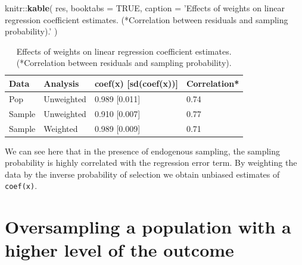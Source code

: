 \documentclass[]{book}
\newenvironment{Shaded}{\begin{snugshade}}{\end{snugshade}}
\newcommand{\KeywordTok}[1]{\textcolor[rgb]{0.13,0.29,0.53}{\textbf{{#1}}}}
\newcommand{\DataTypeTok}[1]{\textcolor[rgb]{0.13,0.29,0.53}{{#1}}}
\newcommand{\StringTok}[1]{\textcolor[rgb]{0.31,0.60,0.02}{{#1}}}
\newcommand{\OtherTok}[1]{\textcolor[rgb]{0.56,0.35,0.01}{{#1}}}
\newcommand{\NormalTok}[1]{{#1}}
\theoremstyle{definition}
\theoremstyle{definition}
\theoremstyle{remark}
\begin{document}
\begin{Shaded}
\begin{Highlighting}[]
\NormalTok{knitr::}\KeywordTok{kable}\NormalTok{(}
  \NormalTok{res, }\DataTypeTok{booktabs =} \OtherTok{TRUE}\NormalTok{,}
  \DataTypeTok{caption =} \StringTok{'Effects of weights on linear regression coefficient estimates. (*Correlation between residuals and sampling probability).'}
\NormalTok{)}
\end{Highlighting}
\end{Shaded}

\begin{table}

\caption{\label{tab:unnamed-chunk-5}Effects of weights on linear regression coefficient estimates. (*Correlation between residuals and sampling probability).}
\centering
\begin{tabular}[t]{llll}
\toprule
Data & Analysis & coef(x) [sd(coef(x))] & Correlation*\\
\midrule
Pop & Unweighted & 0.989 [0.011] & 0.74\\
Sample & Unweighted & 0.910 [0.007] & 0.77\\
Sample & Weighted & 0.989 [0.009] & 0.71\\
\bottomrule
\end{tabular}
\end{table}

We can see here that in the presence of endogenous sampling, the
sampling probability is highly correlated with the regression error
term. By weighting the data by the inverse probability of selection we
obtain unbiased estimates of \texttt{coef(x)}.

\section{Oversampling a population with a higher level of the
outcome}\label{oversampling-a-population-with-a-higher-level-of-the-outcome}
\end{document}
